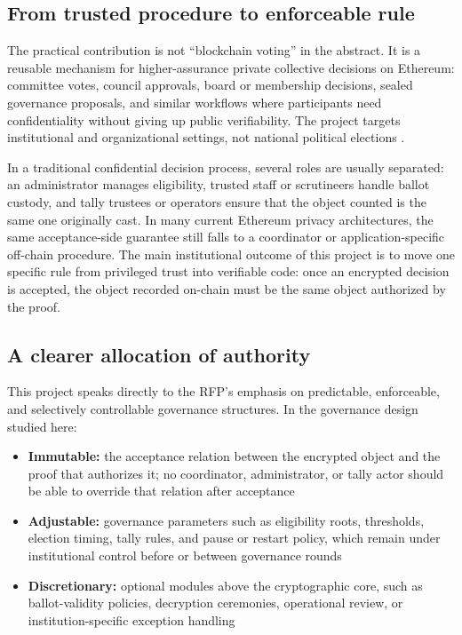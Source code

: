 \documentclass[11pt]{article}
\begin{document}
\subsection{From trusted procedure to enforceable rule}

The practical contribution is not ``blockchain voting'' in the abstract. It is
a reusable mechanism for higher-assurance private collective decisions on
Ethereum: committee votes, council approvals, board or membership decisions,
sealed governance proposals, and similar workflows where participants need
confidentiality without giving up public verifiability. The project targets
institutional and organizational settings, not national political elections
\cite{park2021}.

In a traditional confidential decision process, several roles are usually
separated: an administrator manages eligibility, trusted staff or scrutineers
handle ballot custody, and tally trustees or operators ensure that the object
counted is the same one originally cast. In many current Ethereum privacy
architectures, the same acceptance-side guarantee still falls to a coordinator
or application-specific off-chain procedure. The main institutional outcome of
this project is to move one specific rule from privileged trust into verifiable
code: once an encrypted decision is accepted, the object recorded on-chain must
be the same object authorized by the proof.

\subsection{A clearer allocation of authority}

This project speaks directly to the RFP's emphasis on predictable, enforceable,
and selectively controllable governance structures. In the governance design
studied here:

\begin{itemize}[leftmargin=*]
\item \textbf{Immutable:} the acceptance relation between the encrypted object
      and the proof that authorizes it; no coordinator, administrator, or tally
      actor should be able to override that relation after acceptance
\item \textbf{Adjustable:} governance parameters such as eligibility roots,
      thresholds, election timing, tally rules, and pause or restart policy,
      which remain under institutional control before or between governance
      rounds
\item \textbf{Discretionary:} optional modules above the cryptographic core,
      such as ballot-validity policies, decryption ceremonies, operational
      review, or institution-specific exception handling
\end{itemize}
\end{document}
